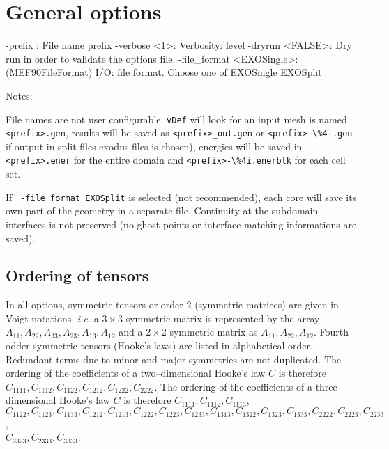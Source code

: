 \documentclass[10pt,oneside]{memoir}
\def\vDef{{\texttt{vDef}} }
\begin{document}
\section{General options}
\begin{boxedverbatim}
-prefix : File name prefix
-verbose <1>: Verbosity: level 
-dryrun <FALSE>: Dry run in order to validate the options file. 
-file_format <EXOSingle>: (MEF90FileFormat) I/O: file format. 
                          Choose one of EXOSingle EXOSplit
\end{boxedverbatim}
Notes: 
\begin{compactenum}
\item File names are not user configurable. \vDef will look for an input mesh is named \verb+<prefix>.gen+, results will be saved as \verb+<prefix>_out.gen+ or \verb+<prefix>-\%4i.gen+ if output in split files exodus files is chosen), energies will be saved in  \verb+<prefix>.ener+ for the entire domain and \verb+<prefix>-\%4i.enerblk+ for each cell set.
\item If \verb+ -file_format EXOSplit+ is selected (not recommended), each core will save its own part of the geometry in a separate file. Continuity at the subdomain interfaces is not preserved (no ghost points or interface matching informations are saved).
\end{compactenum}

\subsection{Ordering of tensors}
In all options, symmetric tensors or order 2 (symmetric matrices) are given in Voigt notations, \emph{i.e.} a $3\times 3$ symmetric matrix is represented by the array $A_{11},A_{22},A_{33},A_{23},A_{13},A_{12}$ and a $2\times 2$ symmetric matrix as $A_{11},A_{22},A_{12}$. Fourth odder symmetric tensors (Hooke's laws) are listed in alphabetical order. Redundant terms due to minor and major symmetries are not duplicated. The ordering of the coefficients of a two--dimensional Hooke's law $C$ is therefore $C_{1111}, C_{1112}, C_{1122}, C_{1212}, C_{1222}, C_{2222}$. The ordering of the coefficients of a three--dimensional Hooke's law $C$ is therefore $C_{1111}, C_{1112}, C_{1113}$, $C_{1122}, C_{1123}, C_{1133}, C_{1212}, C_{1213}, C_{1222}, C_{1223}, C_{1233}, C_{1313}, C_{1322}, C_{1323}, C_{1333}, C_{2222}, C_{2223}, C_{2233}$,\\
$C_{2323}, C_{2333}, C_{3333}$. 
\end{document}

